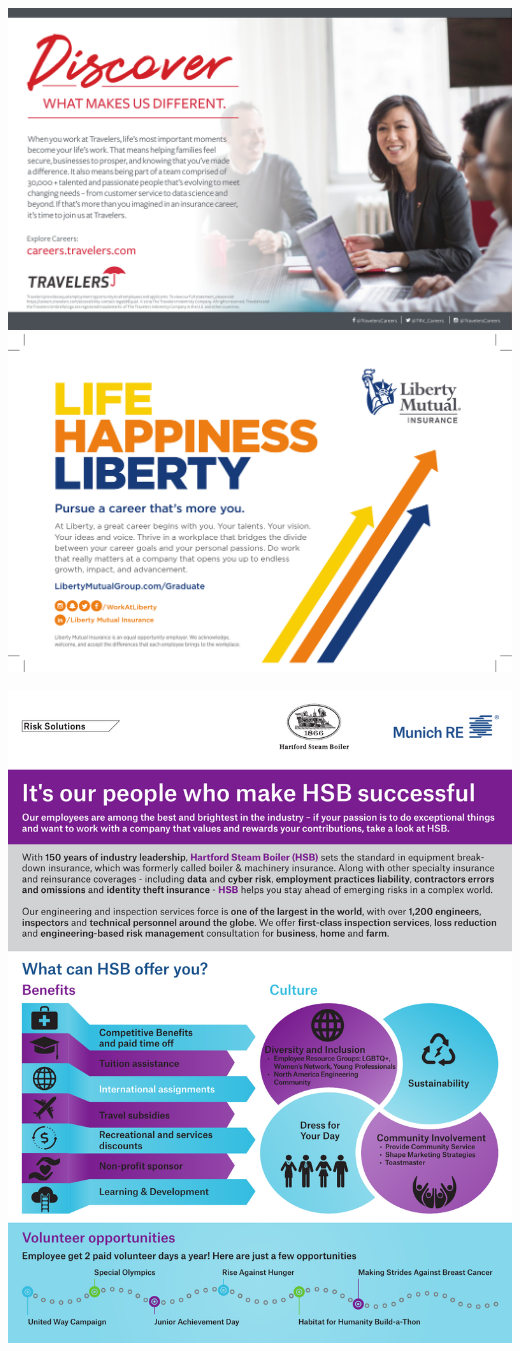\documentclass[10pt]{article}
\begin{document}
\onecolumn
\includegraphics[width=\textwidth]{travelers.pdf}
\hfill
\includegraphics[width=\textwidth]{liberty.pdf}

\clearpage
\includegraphics[page=1, width=\textwidth]{hsb.pdf}
\end{document}
